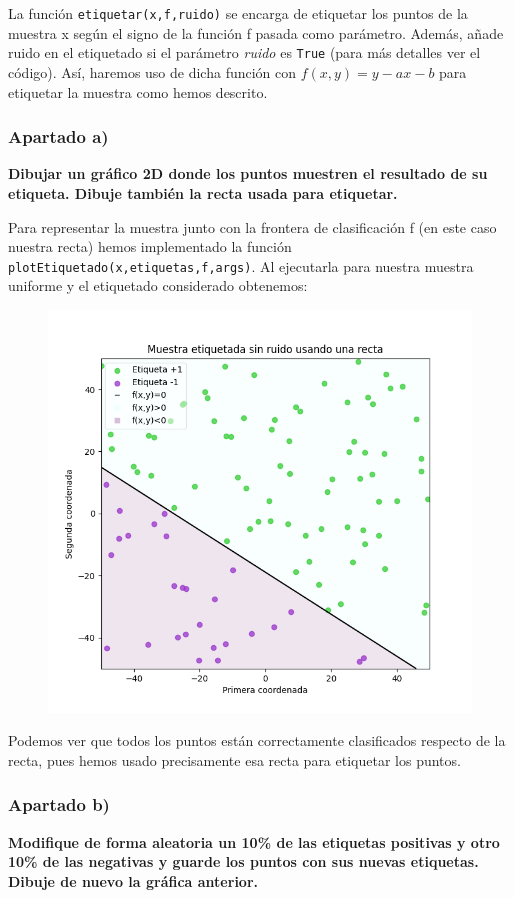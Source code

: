 \documentclass[a4]{article}
\begin{document}
 La función \lstinline|etiquetar(x,f,ruido)| se encarga de etiquetar los puntos de la muestra x según el signo de la función f pasada como parámetro. Además, añade ruido en el etiquetado si el parámetro \textit{ruido} es \lstinline|True| (para más detalles ver el código). Así, haremos uso de dicha función con $ f (x, y) = y - ax - b $ para etiquetar la muestra como hemos descrito.


\subsubsection{Apartado a)}
\textbf{Dibujar un gráfico 2D donde los puntos muestren el resultado de su etiqueta. Dibuje también la recta usada para etiquetar.}

Para representar la muestra junto con la frontera de clasificación f (en este caso nuestra recta) hemos implementado la función \lstinline|plotEtiquetado(x,etiquetas,f,args)|. Al ejecutarla para nuestra muestra uniforme y el etiquetado considerado obtenemos:

\begin{figure}[H]
	\centering
	\includegraphics[width=0.65\linewidth]{img/Figure_4}
	\caption{}
	\label{fig:figure4}
\end{figure}


Podemos ver que todos los puntos están correctamente clasificados respecto de la recta, pues hemos usado precisamente esa recta para etiquetar los puntos. 

\subsubsection{Apartado b)}

\textbf{Modifique de forma aleatoria un 10\% de las etiquetas positivas y otro
10\% de las negativas y guarde los puntos con sus nuevas etiquetas. Dibuje de nuevo
la gráfica anterior.}
\end{document}
